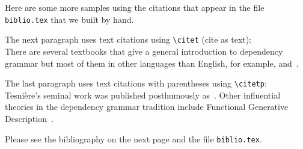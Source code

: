 Here are some more samples using the citations that appear in the file
\verb+biblio.tex+ that we built by hand.

The next paragraph uses text citations using \verb+\citet+ (cite as text):\\
\noindent
There are several textbooks that give a general 
introduction to dependency grammar but
most of them in other languages than English, for example,
\citet{tarvainen82} and~\citet{weber-97}.

The last paragraph uses text citations with parentheses
using \verb+\citetp+:\\
\noindent
Tesni{\`e}re's seminal work was published
posthumously as~\citep{tesniere59}. 
Other influential theories in the dependency
grammar tradition include Functional Generative
Description~\citep{SHP:1986}.

Please see the bibliography on the next page and the file \verb+biblio.tex+.

\clearpage

